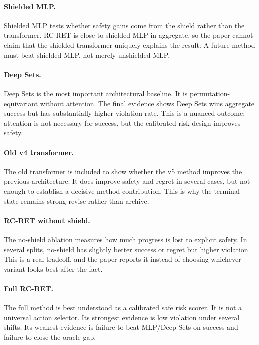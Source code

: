 \documentclass{article}
\newcommand{\method}{RC-RET}
\begin{document}
\paragraph{Shielded MLP.}
Shielded MLP tests whether safety gains come from the shield rather than the transformer.  \method{} is close to shielded MLP in aggregate, so the paper cannot claim that the shielded transformer uniquely explains the result.  A future method must beat shielded MLP, not merely unshielded MLP.

\paragraph{Deep Sets.}
Deep Sets is the most important architectural baseline.  It is permutation-equivariant without attention.  The final evidence shows Deep Sets wins aggregate success but has substantially higher violation rate.  This is a nuanced outcome: attention is not necessary for success, but the calibrated risk design improves safety.

\paragraph{Old v4 transformer.}
The old transformer is included to show whether the v5 method improves the previous architecture.  It does improve safety and regret in several cases, but not enough to establish a decisive method contribution.  This is why the terminal state remains strong-revise rather than archive.

\paragraph{\method{} without shield.}
The no-shield ablation measures how much progress is lost to explicit safety.  In several splits, no-shield has slightly better success or regret but higher violation.  This is a real tradeoff, and the paper reports it instead of choosing whichever variant looks best after the fact.

\paragraph{Full \method.}
The full method is best understood as a calibrated safe risk scorer.  It is not a universal action selector.  Its strongest evidence is low violation under several shifts.  Its weakest evidence is failure to beat MLP/Deep Sets on success and failure to close the oracle gap.
\end{document}
